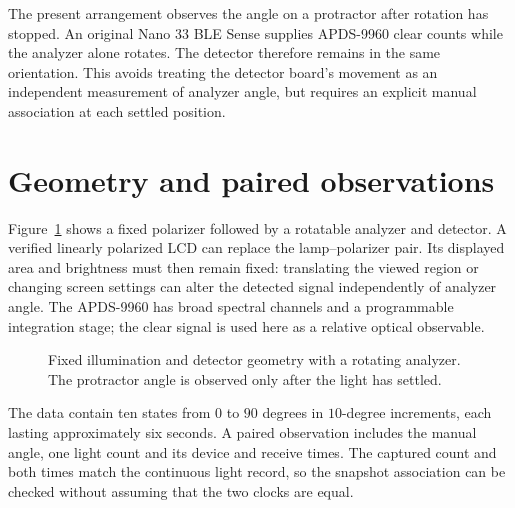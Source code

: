 The present arrangement observes the angle on a protractor after rotation has stopped. An original Nano 33 BLE Sense supplies APDS-9960 clear counts while the analyzer alone rotates. The detector therefore remains in the same orientation. This avoids treating the detector board's movement as an independent measurement of analyzer angle, but requires an explicit manual association at each settled position.

\section{Geometry and paired observations}
Figure~\ref{fig:malus-law-apparatus} shows a fixed polarizer followed by a rotatable analyzer and detector. A verified linearly polarized LCD can replace the lamp--polarizer pair. Its displayed area and brightness must then remain fixed: translating the viewed region or changing screen settings can alter the detected signal independently of analyzer angle. The APDS-9960 has broad spectral channels and a programmable integration stage\cite{apds9960}; the clear signal is used here as a relative optical observable.

\begin{figure}[!htbp]
\centering
{}
\caption{Fixed illumination and detector geometry with a rotating analyzer. The protractor angle is observed only after the light has settled.}
\label{fig:malus-law-apparatus}
\end{figure}

The data contain ten states from $0$ to $90$ degrees in $10$-degree increments, each lasting approximately six seconds. A paired observation includes the manual angle, one light count and its device and receive times. The captured count and both times match the continuous light record, so the snapshot association can be checked without assuming that the two clocks are equal.

